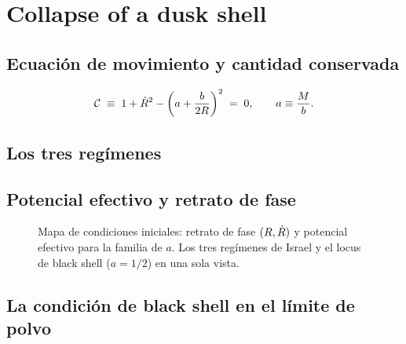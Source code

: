 \chapter{Collapse of a dusk shell}\label{cap:polvo}

\section{Ecuación de movimiento y cantidad conservada}
\begin{equation}
    \mathcal{C} \;\equiv\; 1 + \dot{R}^2 - \left(a + \frac{b}{2R}\right)^2 \;=\; 0,
    \qquad a \equiv \frac{M}{b}.
    \label{eq:C}
\end{equation}

\section{Los tres regímenes}

\section{Potencial efectivo y retrato de fase}
\label{sec:mapa}
\begin{figure}[H]
    \centering
    \caption{Mapa de condiciones iniciales: retrato de fase $(R,\dot{R})$ y
             potencial efectivo para la familia de $a$. Los tres regímenes de
             Israel y el locus de black shell ($a=1/2$) en una sola vista.}
    \label{fig:mapa}
\end{figure}

\section{La condición de black shell en el límite de polvo}
